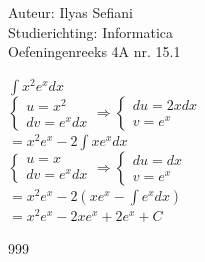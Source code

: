 \documentclass[a4paper]{article}
\begin{document}
\noindent \large Auteur: Ilyas Sefiani \\
\noindent \large Studierichting: Informatica\\
\noindent \large Oefeningenreeks 4A nr. 15.1\\

\medskip

\normalsize

$\displaystyle\int x^2e^xdx$\\

$\left \{
\begin{array}{l}
u=x^2 \\
dv=e^xdx
\end{array}
\right .
\Rightarrow
\left \{
\begin{array}{l}
du=2xdx \\
v=e^x
\end{array}
\right .$\\

$=x^2e^x - 2\displaystyle\int xe^xdx$\\

$\left \{
\begin{array}{l}
u=x \\
dv=e^xdx
\end{array}
\right .
\Rightarrow
\left \{
\begin{array}{l}
du=dx \\
v=e^x
\end{array}
\right .$\\

$=x^2e^x - 2\left(xe^x-\displaystyle\int e^xdx\right)$\\

$=x^2e^x - 2xe^x+2e^x+C$\\

\begin{thebibliography}{999}
\end{thebibliography}
\end{document}
